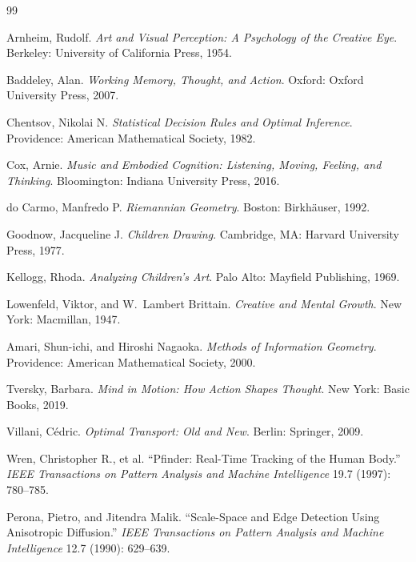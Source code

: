 \documentclass[12pt,a4paper]{article}
\theoremstyle{plain}
\theoremstyle{definition}
\begin{document}
\begin{thebibliography}{99}

Arnheim, Rudolf.
\textit{Art and Visual Perception: A Psychology of the Creative Eye}.
Berkeley: University of California Press, 1954.

Baddeley, Alan.
\textit{Working Memory, Thought, and Action}.
Oxford: Oxford University Press, 2007.

Chentsov, Nikolai N.
\textit{Statistical Decision Rules and Optimal Inference}.
Providence: American Mathematical Society, 1982.

Cox, Arnie.
\textit{Music and Embodied Cognition: Listening, Moving, Feeling, and Thinking}.
Bloomington: Indiana University Press, 2016.

do Carmo, Manfredo P.
\textit{Riemannian Geometry}.
Boston: Birkh\"auser, 1992.

Goodnow, Jacqueline J.
\textit{Children Drawing}.
Cambridge, MA: Harvard University Press, 1977.

Kellogg, Rhoda.
\textit{Analyzing Children's Art}.
Palo Alto: Mayfield Publishing, 1969.

Lowenfeld, Viktor, and W.\ Lambert Brittain.
\textit{Creative and Mental Growth}.
New York: Macmillan, 1947.

Amari, Shun-ichi, and Hiroshi Nagaoka.
\textit{Methods of Information Geometry}.
Providence: American Mathematical Society, 2000.

Tversky, Barbara.
\textit{Mind in Motion: How Action Shapes Thought}.
New York: Basic Books, 2019.

Villani, C\'edric.
\textit{Optimal Transport: Old and New}.
Berlin: Springer, 2009.

Wren, Christopher R., et al.
``Pfinder: Real-Time Tracking of the Human Body.''
\textit{IEEE Transactions on Pattern Analysis and Machine Intelligence}
19.7 (1997): 780--785.

Perona, Pietro, and Jitendra Malik.
``Scale-Space and Edge Detection Using Anisotropic Diffusion.''
\textit{IEEE Transactions on Pattern Analysis and Machine Intelligence}
12.7 (1990): 629--639.

\end{thebibliography}
\end{document}
